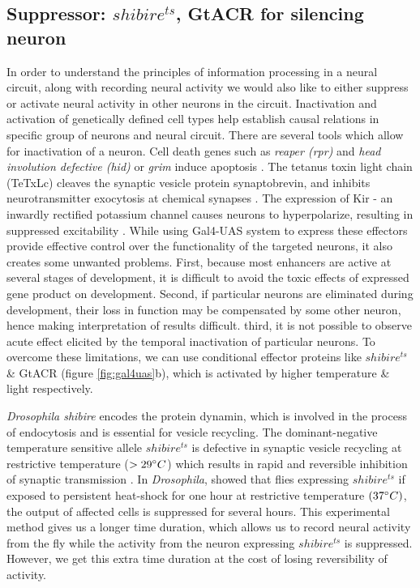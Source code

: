 \subsection{Suppressor: $shibire^{ts}$, GtACR for silencing neuron}
In order to understand the principles of information processing in a neural circuit, along with recording neural activity we would also like to either suppress or activate neural activity in other neurons in the circuit. Inactivation and activation of genetically defined cell types help establish causal relations in specific group of neurons and neural circuit. There are several tools which allow for inactivation of a neuron. Cell death genes such as \textit{reaper (rpr)} and \textit{head involution defective (hid)} or \textit{grim} induce apoptosis \parencite{Chen1996, Grether1995}.  The tetanus toxin light chain (TeTxLc) cleaves the synaptic vesicle protein synaptobrevin, and inhibits neurotransmitter exocytosis at chemical synapses \parencite{Sweeney1995}. The expression of Kir - an inwardly rectified potassium channel causes neurons to hyperpolarize, resulting in suppressed excitability \parencite{Johns1999}. While using Gal4-UAS system to express these effectors provide effective control over the functionality of the targeted neurons, it also creates some unwanted problems. First, because most enhancers are active at several stages of development, it is difficult to avoid the toxic effects of expressed gene product on development. Second, if particular neurons are eliminated during development, their loss in function may be compensated by some other neuron, hence making interpretation of results difficult. third, it is not possible to observe acute effect elicited by the temporal inactivation of particular neurons. To overcome these limitations, we can use conditional effector proteins like $shibire^{ts}$ \& GtACR (figure  \ref{fig:gal4uas}b), which is activated by higher temperature \& light respectively. 

\textit{Drosophila shibire} encodes the protein dynamin, which is involved in the process of endocytosis and is essential for vesicle recycling. The dominant-negative temperature sensitive allele $shibire^{ts}$ is defective in synaptic vesicle recycling at restrictive temperature ($>29\degree C$) which results in rapid and reversible inhibition of synaptic transmission \parencite{Kitamoto2001}. In \textit{Drosophila}, \cite{Joesch2010} showed that flies expressing $shibire^{ts}$ if exposed to persistent heat-shock for one hour at restrictive temperature $(37\degree C)$, the output of affected cells is suppressed for several hours. This experimental method gives us a longer time duration, which allows us to record neural activity from the fly while the activity from the neuron expressing $shibire^{ts}$ is suppressed. However, we get this extra time duration at the cost of losing reversibility of activity.


